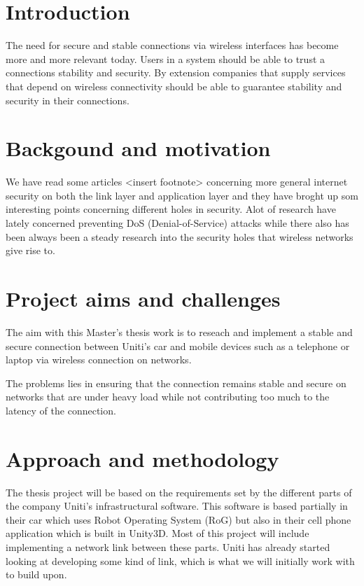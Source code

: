 \documentclass[a4paper]{article}
\begin{document}
\section{Introduction}
The need for secure and stable connections via wireless interfaces has become
more and more relevant today.  Users in a system should be able to trust a
connections stability and security. By extension companies that supply services
that depend on wireless connectivity should be able to guarantee stability
and security in their connections.


\section{Backgound and motivation}

We have read some articles <insert footnote> concerning more general
internet security on both the link layer and application layer and
they have broght up som interesting points concerning different holes
in security. Alot of research have lately concerned preventing 
DoS (Denial-of-Service) attacks while there also has been always been a
steady research into the security holes that wireless networks give rise to. 



\section{Project aims and challenges}

The aim with this Master's thesis work is to reseach and implement a stable and
secure connection between Uniti's car and mobile devices such as a telephone or
laptop via wireless connection on networks.

The problems lies in ensuring that the connection remains stable and secure on
networks that are under heavy load while not contributing too much to the
latency of the connection.

\section{Approach and methodology}
The thesis project will be based on the requirements set by the different parts
of the company Uniti's infrastructural software. This software is based
partially in their car which uses Robot Operating System (RoG) but also in
their cell phone application which is built in Unity3D. Most of this project
will include implementing a network link between these parts. Uniti has
already started looking at developing some kind of link, which is what
we will initially work with to build upon.
\end{document}
